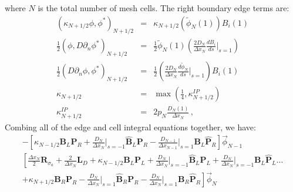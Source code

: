 \documentclass[11pt]{article}
\newcommand{\beanum}{\begin{eqnarray}}
\newcommand{\eeanum}{\end{eqnarray}}
\newcommand{\B}[1]{\ensuremath{{B_{#1} }}}
\newcommand{\p}{\ensuremath{ d}}
\newcommand{\pec}{\, ,}
\begin{document}
where $N$ is the total number of mesh cells.  The right boundary edge terms are:
\beanum
\left( \kappa_{N+1/2} \phi, \phi^*\right)_{N+1/2} &=& \kappa_{N+1/2}\left(\widetilde{\phi}_N(1) \right) \B{i}(1) \\
%
%
\frac{1}{2}\left( \phi, D\partial_n \phi^* \right)_{N+1/2} &=&  \frac{1}{2}\widetilde{\phi}_N(1) \left(\frac{2 D_N}{\Delta x_N} \frac{\p \B{i}}{\p s} \bigg \lvert_{s=1} \right)\\
%
%
\frac{1}{2}\left( D \partial_n \phi , \phi^* \right)_{N+1/2} &=& \frac{1}{2}\left( \frac{2D_N}{\Delta x_N} \frac{\p \widetilde{\phi}_N}{\p s} \bigg \lvert_{s=1} \right) \B{i}(1) \\
%
%
\kappa_{N+1/2} &=& \max \left( \frac{1}{4},\kappa_{N+1/2}^{IP} \right) \\
%
%
\kappa_{N + 1/2}^{IP} &=& 2 p_N \frac{D_N(1)}{\Delta x_N} \pec
\eeanum
Combing all of the edge and cell integral equations together, we have:
\begin{multline}
-\left[\kappa_{N-1/2}\mathbf{B}_L\mathbf{P}_R + \frac{D_N}{\Delta x_N}\bigg \lvert_{s=-1} \widehat{\mathbf B}_L \mathbf{P}_R - \frac{D_{N-1}}{\Delta x_{N-1} }\bigg \lvert_{s=1} \mathbf{B}_L \widehat{\mathbf P }_R \right]\vec{\phi}_{N-1} \\
\left[ \frac{\Delta x_N}{2}\mathbf{R}_{\sigma_a} + \frac{2}{\Delta x_N} \mathbf{L}_D + \kappa_{N-1/2}\mathbf{B}_L\mathbf{P}_L + \frac{D_N}{\Delta x_N} \bigg \lvert_{s=-1} \widehat{\mathbf B}_L\mathbf{P}_L + \frac{D_N}{\Delta x_N}\bigg \lvert_{s=-1} \mathbf{B}_L\widehat{\mathbf P}_L  \dots \right. \\
\left. + \kappa_{N+1/2}\mathbf{B}_R\mathbf{P}_R - \frac{D_N}{\Delta x_N}\bigg \lvert_{s=1}\widehat{\mathbf B}_R \mathbf{P}_R - \frac{D_N}{\Delta x_N}\bigg \lvert_{s=1}\mathbf{B}_R \widehat{\mathbf P}_R   \right]\vec{\phi}_N
\end{multline}
\end{document}

